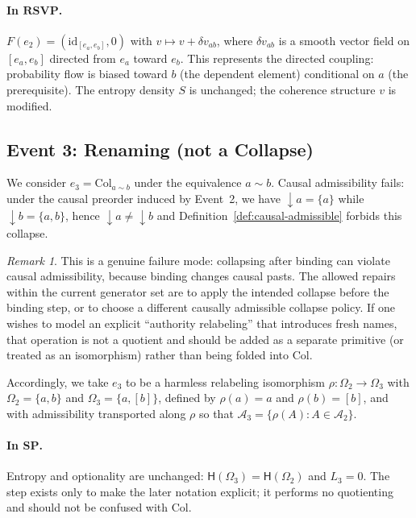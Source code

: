 \documentclass[12pt,a4paper]{article}
\theoremstyle{definition}
\theoremstyle{remark}
\newtheorem{remark}[theorem]{Remark}
\newcommand{\Ent}{\ensuremath{\mathsf{H}}}
\newcommand{\SP}{\mathbf{SP}}
\newcommand{\RSVP}{\mathbf{RSVP}}
\providecommand{\id}{\mathrm{id}}
\renewcommand{\id}{\mathrm{id}}
\newcommand{\Col}{\ensuremath{\mathrm{Col}}}
\newcommand{\vF}{v}
\newcommand{\SF}{S}
\newcommand{\downset}[1]{\!\downarrow\!{#1}}
\begin{document}
\paragraph{In $\RSVP$.}
$F(e_2)=(\id_{[e_a,e_b]},0)$ with $\vF\mapsto\vF+\delta\vF_{ab}$, where $\delta\vF_{ab}$
is a smooth vector field on $[e_a,e_b]$ directed from $e_a$ toward $e_b$. This
represents the directed coupling: probability flow is biased toward $b$ (the dependent
element) conditional on $a$ (the prerequisite). The entropy density $\SF$ is unchanged;
the coherence structure $\vF$ is modified.

\subsection{Event 3: Renaming (not a Collapse)}

We consider $e_3=\Col_{a\sim b}$ under the equivalence $a\sim b$. Causal admissibility fails:
under the causal preorder induced by Event~2, we have $\downset{a}=\{a\}$ while $\downset{b}=\{a,b\}$, hence $\downset{a}\neq\downset{b}$ and Definition~\ref{def:causal-admissible} forbids this collapse.

\begin{remark}
This is a genuine failure mode: collapsing after binding can violate causal admissibility, because binding changes causal pasts. The allowed repairs within the current generator set are to apply the intended collapse before the binding step, or to choose a different causally admissible collapse policy. If one wishes to model an explicit ``authority relabeling'' that introduces fresh names, that operation is not a quotient and should be added as a separate primitive (or treated as an isomorphism) rather than being folded into $\Col$.
\end{remark}

Accordingly, we take $e_3$ to be a harmless relabeling isomorphism $\rho:\Omega_2\to\Omega_3$ with $\Omega_2=\{a,b\}$ and $\Omega_3=\{a,[b]\}$, defined by $\rho(a)=a$ and $\rho(b)=[b]$, and with admissibility transported along $\rho$ so that $\mathcal{A}_3=\{\rho(A):A\in\mathcal{A}_2\}$.

\paragraph{In $\SP$.}
Entropy and optionality are unchanged: $\Ent(\Omega_3)=\Ent(\Omega_2)$ and $L_3=0$. The step exists only to make the later notation explicit; it performs no quotienting and should not be confused with $\Col$.
\end{document}
